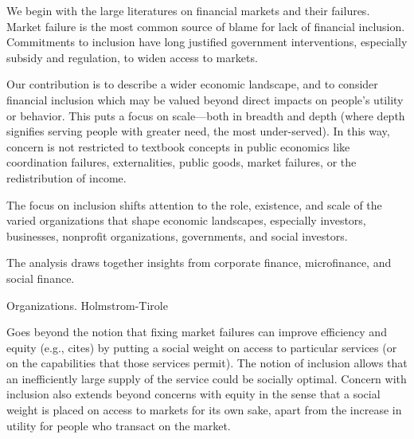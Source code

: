 \documentclass[letterpaper, 12pt]{article}
\begin{document}
We begin with the large literatures on financial markets and their failures. Market failure is the most common source of blame for lack of financial inclusion. Commitments to inclusion have long justified government interventions, especially subsidy and regulation, to widen access to markets. 

Our contribution is to describe a wider economic landscape, and to consider financial inclusion which may be valued beyond direct impacts on people's utility or behavior. This puts a focus on scale---both in breadth and depth (where depth signifies serving people with greater need, the most under-served). In this way, concern is not restricted to textbook concepts in public economics like coordination failures, externalities, public goods, market failures, or the redistribution of income. 

The focus on inclusion shifts attention to the role, existence, and scale of the varied organizations that shape economic landscapes, especially investors, businesses, nonprofit organizations, governments, and social investors. 

The analysis draws together insights from corporate finance, microfinance, and social finance.



Organizations. Holmstrom-Tirole


Goes beyond the notion that fixing market failures can improve efficiency and equity (e.g., cites) by putting a social weight on access to particular services (or on the capabilities that those services permit). The notion of inclusion 
allows that an inefficiently large supply of the service could be socially optimal. Concern with inclusion also extends beyond concerns with equity in the sense that a social weight is placed on access to markets for its own sake, apart from the increase in utility for people who transact on the market. 
\end{document}
